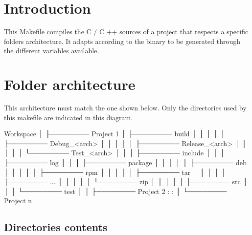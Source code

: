\hypertarget{index_intro_sec}{}\section{Introduction}\label{index_intro_sec}
This Makefile compiles the C / C ++ sources of a project that respects a specific folders architecture. It adapts according to the binary to be generated through the different variables available.\hypertarget{index_architecture_sec}{}\section{Folder architecture}\label{index_architecture_sec}
This architecture must match the one shown below. Only the directories used by this makefile are indicated in this diagram. 
\begin{DoxyPre}
Workspace
    │
    ├──────── Project 1
    │            ├──────── build
    │            │          │
    │            │          ├──────── Debug\_<arch>
    │            │          │
    │            │          ├──────── Release\_<arch>
    │            │          │
    │            │          └──────── Test\_<arch>
    │            │
    │            ├──────── include
    │            │
    │            ├──────── log
    │            │
    │            ├──────── package
    │            │            │
    │            │            ├──────── deb
    │            │            │
    │            │            ├──────── rpm
    │            │            │
    │            │            ├──────── tar
    │            │            │
    │            │            ├──────── ...
    │            │            │
    │            │            └──────── zip
    │            │
    │            │
    │            ├──────── src
    │            │
    │            └──────── test
    │
    │
    ├──────── Project 2
    :
    :
    │
    └──────── Project n
\end{DoxyPre}
 \hypertarget{index_dir_content}{}\subsection{Directories contents}\label{index_dir_content}

